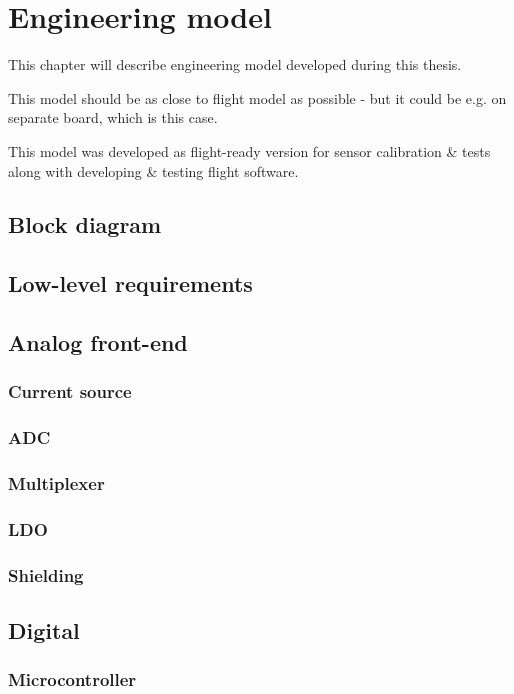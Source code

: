 \chapter{Engineering model}
This chapter will describe engineering model developed during this thesis.

This model should be as close to flight model as possible - but it could be e.g. on separate board, which is this case.

This model was developed as flight-ready version for sensor calibration \& tests along with developing \& testing flight software.

\section{Block diagram}

\section{Low-level requirements}

\section{Analog front-end}
\subsection{Current source}
\subsection{ADC}
\subsection{Multiplexer}
\subsection{LDO}
\subsection{Shielding}

\section{Digital}
\subsection{Microcontroller}
